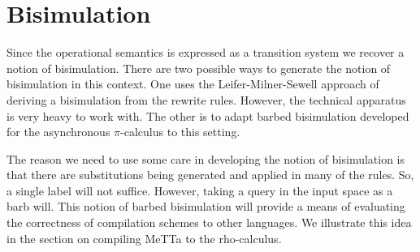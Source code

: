 \section{Bisimulation}
Since the operational semantics is expressed as a transition system we recover a notion of bisimulation. There are two possible ways to generate the notion of bisimulation in this context. One uses the Leifer-Milner-Sewell approach of deriving a bisimulation from the rewrite rules. However, the technical apparatus is very heavy to work with. The other is to adapt barbed bisimulation developed for the asynchronous $\pi$-calculus to this setting.

The reason we need to use some care in developing the notion of bisimulation is that there are substitutions being generated and applied in many of the rules. So, a single label will not suffice. However, taking a query in the input space as a barb will. This notion of barbed bisimulation will provide a means of evaluating the correctness of compilation schemes to other languages. We illustrate this idea in the section on compiling MeTTa to the rho-calculus.

